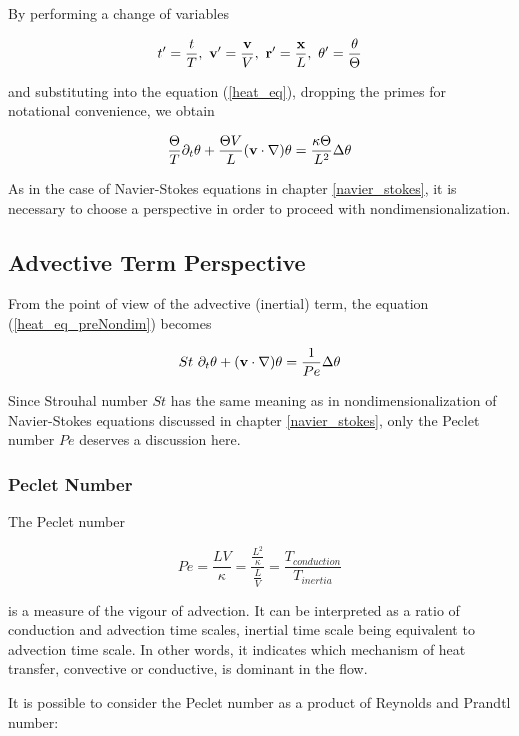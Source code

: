 By performing a change of variables 

$$ t^{\prime}  = \frac{t}{T},~ \mathbf{v^{\prime}} = \frac{\mathbf{v}}{V},~ \mathbf{r^{\prime}} = \frac{\mathbf{x}}{L},~ \theta^{\prime} = \frac{\theta}{\Theta} $$ 

and substituting into the equation (\ref{heat_eq}), dropping the primes for notational convenience, we obtain

\begin{equation} \label{heat_eq_preNondim}
 \frac{\Theta}{T} \partial_t\theta + \frac{\Theta V}{L} (\mathbf{v} \cdot \nabla)\theta = \frac{\kappa \Theta}{L^2} \Delta\theta 
\end{equation}

As in the case of Navier-Stokes equations in chapter \ref{navier_stokes}, it is necessary to choose a perspective in order to proceed with nondimensionalization.

\subsection{Advective Term Perspective}

From the point of view of the advective (inertial) term, the equation (\ref{heat_eq_preNondim}) becomes

\begin{equation} \label{heat_eq_inertNondim}
 St~ \partial_t\theta + (\mathbf{v} \cdot \nabla)\theta = \frac{1}{Pe} \Delta\theta  
\end{equation}
 
Since Strouhal number $St$ has the same meaning as in nondimensionalization of Navier-Stokes equations discussed in chapter \ref{navier_stokes}, only the Peclet number $Pe$ deserves a discussion here.

\subsubsection{Peclet Number}

The Peclet number 

$$ Pe = \frac{LV}{\kappa} = \frac{\frac{L^2}{\kappa}}{\frac{L}{V}} = \frac{T_{conduction}}{T_{inertia}} $$

is a measure of the vigour of advection. It can be interpreted as a ratio of conduction and advection time scales, inertial time scale being equivalent to advection time scale. In other words, it indicates which mechanism of heat transfer, convective or conductive, is dominant in the flow.

It is possible to consider the Peclet number as a product of Reynolds and Prandtl number:

